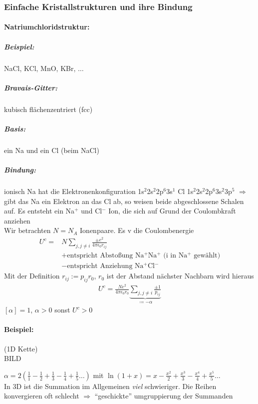 \documentclass[paper=A4,12pt,pagesize,twoside,BCOR=8mm,ngerman]{scrartcl}
\begin{document}
		\subsubsection{Einfache Kristallstrukturen und ihre Bindung}
			\paragraph*{Natriumchloridstruktur:}
				\subparagraph*{Beispiel:} NaCl, KCl, MnO, KBr, $\ldots$
				\subparagraph*{Bravais-Gitter:} kubisch 
				flächenzentriert (fcc)
				\subparagraph*{Basis:} ein Na und ein Cl (beim NaCl)
				\subparagraph*{Bindung:} ionisch
				Na hat die Elektronenkonfiguration 
				1s$^{2}$2s$^{2}$2p$^{6}$3s$^{1}$ Cl 
				1s$^{2}$2s$^{2}$2p$^{6}$3s$^{2}$3p$^{5}$ $\Rightarrow$ 
				gibt das Na ein Elektron an das Cl ab, so weisen beide 
				abgeschlossene Schalen auf. Es entsteht ein Na$^{+}$ 
				und Cl$^{-}$ Ion, die sich auf Grund der Coulombkraft 
				anziehen\\
				Wir betrachten \emph{$N=N_{A}$} Ionenpaare. Es v die 
				Coulombenergie
				\begin{align*}
					U^{c} = & N \sum_{j, j\neq i} \frac{\pm e^{2}}{4\pi 
					\epsilon_{0} r_{ij}}\\
					& + \text{entspricht Abstoßung Na$^{+}$Na$^{+}$ (i 
					in Na$^{+}$ gewählt)}\\
					& - \text{entspricht Anziehung Na$^{+}$Cl$^{-}$}
				\end{align*}
				Mit der Definition $r_{ij} := p_{ij}r_{0}$, $r_{0}$ ist 
				der Abstand nächster Nachbarn wird hieraus
				\begin{align*}
					U^{c} = \frac{Ne^{2}}{4\pi\epsilon_{0}r_{0}} 
					\underbrace {\sum_{j, j \neq i} 
					\frac{\pm 1}{p_{ij}}}_{\coloneqq -\alpha}
				\end{align*}
				$[\alpha] = 1$, $\alpha > 0$ sonst $U^{c} > 0$
				
				\paragraph*{Beispiel:} (1D Kette)\\
				BILD
				
				$\alpha = 2\left( \frac{1}{1} - \frac{1}{2} + 
				\frac{1}{3} - \frac{1}{4} + \frac{1}{5} \ldots \right)$
				mit $\ln (1+x) =x - \frac{x^{2}}{2} + \frac{x^{3}}{3} - 
				\frac{x^{4}}{4} + \frac{x^{5}}{5} \ldots$\\
				In 3D ist die Summation im Allgemeinen \emph{viel} 
				schwieriger. Die Reihen konvergieren oft schlecht 
				$\Rightarrow${}	"`geschickte"' umgruppierung der 
				Summanden\\
				
\end{document}
